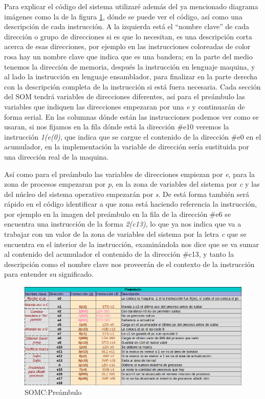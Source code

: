 \documentclass[letterpaper,12pt,oneside]{book}
\begin{document}
		Para explicar el código del sistema utilizaré además del ya mencionado diagrama imágenes como la de la figura \ref{fig:somcPreambulo}, dónde
		se puede ver el código, así como una descripción de cada instrucción. A la izquierda está el ``nombre clave'' de cada dirección o grupo
		de direcciones si es que lo necesitan, es una descripción corta acerca de esas direcciones, por ejemplo en las instrucciones
		coloreadas de color rosa hay un nombre clave que indica que es una bandera; en la parte del medio tenemos la dirección de memoria, después
		la instrucción en lenguaje maquina, y al lado la instrucción en lenguaje ensamblador, para finalizar en la parte derecha con la descripción completa
		de la instrucción si está fuera necesaria. Cada sección del SOM tendrá variables de direcciones diferentes, así
		para el preámbulo las variables que indiquen las direcciones empezaran por una \textit{e} y continuarán de forma serial. En las columnas
		dónde están las instrucciones podemos ver como se usaran, si nos fijamos en la fila dónde está la dirección \#e10 veremos la instrucción
		\textit{1(e(0)}, que indica que se cargue el contenido de la dirección \#e0 en el acumulador, en la implementación la variable
		de dirección sería sustituida por una dirección real de la maquina.
		
		Así como para el preámbulo las variables de direcciones empiezan por \textit{e}, para la zona de procesos empezaran por \textit{p},
		en la zona de variables del sistema por \textit{c} y las del núcleo del sistema operativo empezarán por \textit{s}. De está forma
		también será rápido en el código identificar a que zona está haciendo referencia la instrucción, por ejemplo en la imagen
		del preámbulo en la fila de la dirección \#e6 se encuentra una instrucción de la forma \textit{2(c13)}, lo que ya nos indica
		que va a trabajar con un valor de la zona de variables del sistema por la letra \textit{c} que se encuentra en el interior
		de la instrucción, examinándola nos dice que se va sumar al contenido del acumulador el contenido de la dirección \#c13, y tanto
		la descripción como el nombre clave nos proveerán de el contexto de la instrucción para entender su significado.
		
		\begin{figure}[h]		
			\centering
			\includegraphics[scale=0.45]{media/CARDIACC/Preambulo.png}
			\caption{SOMC:Preámbulo}
			\label{fig:somcPreambulo}
		\end{figure}
		
\end{document}
